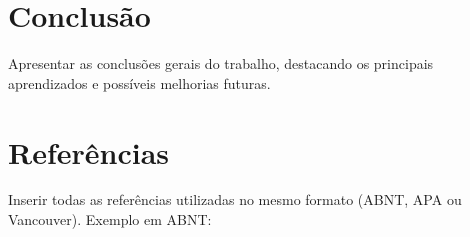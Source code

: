 \documentclass[12pt,a4paper]{article}
\begin{document}
\section{Conclusão}
Apresentar as conclusões gerais do trabalho, destacando os principais aprendizados e possíveis melhorias futuras.

\section*{Referências}

Inserir todas as referências utilizadas no mesmo formato (ABNT, APA ou Vancouver).  
Exemplo em ABNT:

\end{document}
